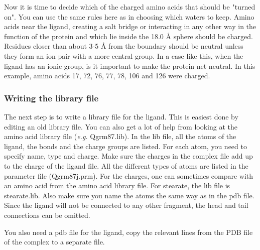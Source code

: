 \documentclass[a4paper,10pt]{article}
\begin{document}
Now it is time to decide which  of the charged amino acids that should
be "turned on". You  can use the same rules here  as in choosing which
waters to keep.  Amino acids near the ligand, creating  a salt bridge
or interacting  in any other  way in the  function of the  protein and
which lie  inside the  18.0 {\AA} sphere  should be  charged. Residues
closer than about 3-5 {\AA} from the boundary should be neutral unless
they form an ion pair with a  more central group. In a case like this,
when  the ligand  has an  ionic  group, is  it important  to make  the
protein net neutral. In this example,  amino acids 17, 72, 76, 77, 78,
106 and 126 were charged. 

\subsubsection{Writing the library file}
The next  step is  to write  a library  file for  the ligand.  This is
easiest done by editing an old library file. You can also get a lot of
help  from  looking at  the  amino  acid library  file  (\textit{e.g.}
Qgrm87.lib). In the  lib file, all the atoms of  the ligand, the bonds
and the charge  groups are listed. For each atom,  you need to specify
name, type and  charge. Make sure the charges in  the complex file add
up to the charge of the ligand  file. All the different types of atoms
are listed in  the parameter file (Qgrm87j.prm). For  the charges, one
can sometimes compare  with an amino acid from the  amino acid library
file. For stearate,  the lib file is stearate.lib. Also  make sure you
name the atoms the same way as  in the pdb file. Since the ligand will
not be connected to any other  fragment, the head and tail connections
can be omitted.

You also need a pdb file for  the ligand, copy the relevant lines from
the PDB file of the complex to a separate file.
\end{document}
